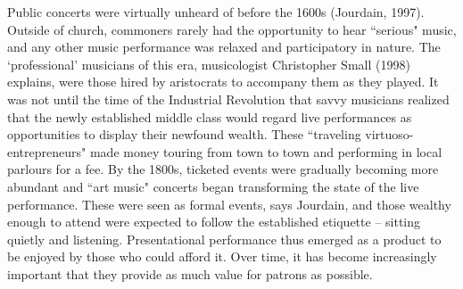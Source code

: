 Public concerts were virtually unheard of before the 1600s (Jourdain, 1997). Outside of church, commoners rarely had the opportunity to hear ``serious" music, and any other music performance was relaxed and participatory in nature. The `professional' musicians of this era, musicologist Christopher Small (1998) explains, were those hired by aristocrats to accompany them as they played. It was not until the time of the Industrial Revolution that savvy musicians realized that the newly established middle class would regard live performances as opportunities to display their newfound wealth. These ``traveling virtuoso-entrepreneurs" made money touring from town to town and performing in local parlours for a fee. By the 1800s, ticketed events were gradually becoming more abundant and ``art music" concerts began transforming the state of the live performance. These were seen as formal events, says Jourdain, and those wealthy enough to attend were expected to follow the established etiquette -- sitting quietly and listening. Presentational performance thus emerged as a product to be enjoyed by those who could afford it. Over time, it has become increasingly important that they provide as much value for patrons as possible.

